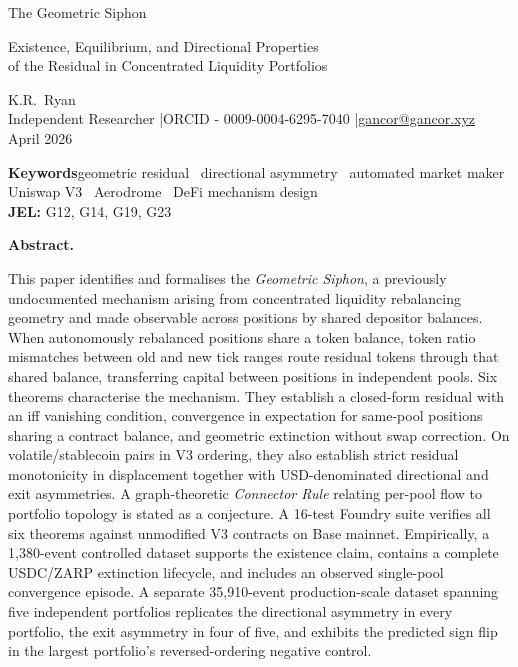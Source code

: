 \documentclass[11pt,a4paper]{article}
\renewenvironment{abstract}{%
  \fontsize{10pt}{13pt}\selectfont
  \begin{list}{}{%
    \setlength{\leftmargin}{0.5in}%
    \setlength{\rightmargin}{0.5in}%
    \setlength{\listparindent}{0pt}%
    \setlength{\parsep}{6pt plus 2pt minus 1pt}%
    \setlength{\topsep}{0pt}%
    \setlength{\partopsep}{0pt}%
  }\item[]\noindent\textbf{Abstract.}\hspace{0.5em}\ignorespaces
}{\end{list}}
\theoremstyle{plain}
\begin{document}
\sloppy
\thispagestyle{plain}

\noindent\parbox[t][8.05cm][t]{\linewidth}{%
\begin{center}
{\fontsize{25pt}{29pt}\selectfont The Geometric Siphon}\\[16pt]
{\fontsize{17pt}{18pt}\selectfont Existence, Equilibrium, and Directional Properties\\[10pt]
of the Residual in Concentrated Liquidity Portfolios\strut}

\vspace{24pt}
{\large K.R.\ Ryan}\\[4pt]
{\fontsize{9pt}{11pt}\selectfont Independent Researcher \quad|\quad ORCID - 0009-0004-6295-7040 \quad|\quad \href{mailto:gancor@gancor.xyz}{gancor@gancor.xyz}}\\[4pt]
{\fontsize{9pt}{11pt}\selectfont April 2026}

\vspace{8pt}
{\fontsize{9pt}{11pt}\selectfont
\textbf{Keywords}\hspace{0.6em}geometric residual \textperiodcentered\ directional asymmetry \textperiodcentered\ automated market maker \\
Uniswap V3 \textperiodcentered\ Aerodrome \textperiodcentered\ DeFi mechanism design\\[4pt]
\textbf{JEL:} G12, G14, G19, G23}
\end{center}}

\vspace{-1pt}
\centerline{\scalebox{1.5}{$\therefore$}}
\vspace{14pt}

\begin{abstract}
This paper identifies and formalises the \emph{Geometric Siphon}, a previously undocumented mechanism arising from concentrated liquidity rebalancing geometry and made observable across positions by shared depositor balances. When autonomously rebalanced positions share a token balance, token ratio mismatches between old and new tick ranges route residual tokens through that shared balance, transferring capital between positions in independent pools. Six theorems characterise the mechanism. They establish a closed-form residual with an iff vanishing condition, convergence in expectation for same-pool positions sharing a contract balance, and geometric extinction without swap correction. On volatile/stablecoin pairs in V3 ordering, they also establish strict residual monotonicity in displacement together with USD-denominated directional and exit asymmetries. A graph-theoretic \emph{Connector Rule} relating per-pool flow to portfolio topology is stated as a conjecture. A 16-test Foundry suite verifies all six theorems against unmodified V3 contracts on Base mainnet. Empirically, a 1{,}380-event controlled dataset supports the existence claim, contains a complete USDC/ZARP extinction lifecycle, and includes an observed single-pool convergence episode. A separate 35{,}910-event production-scale dataset spanning five independent portfolios replicates the directional asymmetry in every portfolio, the exit asymmetry in four of five, and exhibits the predicted sign flip in the largest portfolio's reversed-ordering negative control.
\end{abstract}
\end{document}
